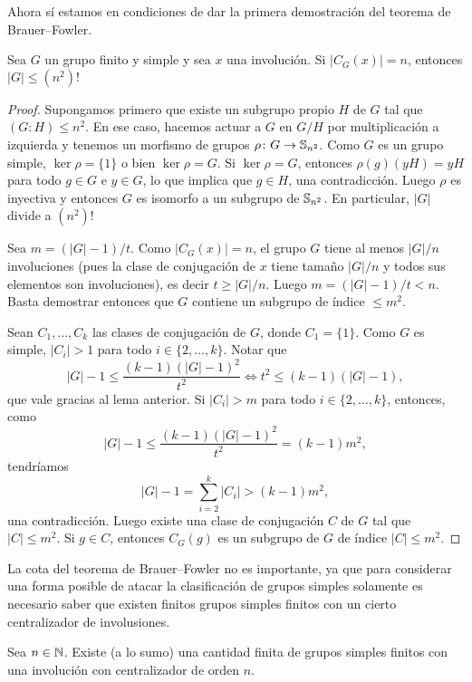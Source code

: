 Ahora sí estamos en condiciones de dar la primera demostración del teorema de
Brauer--Fowler. 

\begin{theorem}
Sea $G$ un grupo finito y simple y sea $x$ una involución. Si $|C_G(x)|=n$, entonces $|G|\leq (n^2)!$	
\end{theorem}

\begin{proof}
Supongamos primero que existe un subgrupo propio $H$ de $G$ tal que
$(G:H)\leq n^2$. En ese caso, hacemos actuar a $G$ en $G/H$ por multiplicación a izquierda 
y tenemos un morfismo de grupos $\rho\colon G\to\mathbb{S}_{n^2}$. Como $G$ es un grupo simple, 
$\ker\rho=\{1\}$ o bien $\ker\rho=G$. Si $\ker\rho=G$, entonces $\rho(g)(yH)=yH$ para todo
$g\in G$ e $y\in G$, lo que implica que $g\in H$, una contradicción. Luego $\rho$ es inyectiva
y entonces $G$ es isomorfo a un subgrupo de $\mathbb{S}_{n^2}$. En particular, $|G|$ divide a $(n^2)!$

Sea $m=(|G|-1)/t$. 
Como $|C_G(x)|=n$, el grupo $G$ tiene al menos $|G|/n$ involuciones (pues la clase de conjugación
de $x$ tiene tamaño $|G|/n$ y todos sus elementos son involuciones), es decir $t\geq |G|/n$. Luego
$m=(|G|-1)/t<n$. Basta demostrar entonces que $G$ contiene un subgrupo de índice $\leq m^2$. 

Sean $C_1,\dots,C_k$ las clases de conjugación de $G$, donde $C_1=\{1\}$. 
Como $G$ es simple, $|C_i|>1$ 
para todo $i\in\{2,\dots,k\}$. Notar que 
\[
|G|-1\leq\frac{(k-1)(|G|-1)^2}{t^2}\Longleftrightarrow t^2\leq(k-1)(|G|-1),
\]
que vale gracias al lema anterior. 
Si $|C_i|>m$ para todo $i\in\{2,\dots,k\}$, entonces, como
\[
|G|-1\leq\frac{(k-1)(|G|-1)^2}{t^2}=(k-1)m^2,
\]
tendríamos 
\[
|G|-1=\sum_{i=2}^k|C_i|>(k-1)m^2,
\]
una contradicción. Luego existe una clase de conjugación $C$ de $G$ tal que $|C|\leq m^2$. Si $g\in C$, entonces
$C_G(g)$ es un subgrupo de $G$ de índice $|C|\leq m^2$.
\end{proof}

La cota del teorema de Brauer--Fowler no es importante, ya que
para considerar una forma posible de atacar la clasificación de grupos simples 
solamente es necesario saber que existen  
finitos grupos simples finitos con un cierto centralizador de involusiones.

\begin{corollary}
Sea $n\in\mathbb{N}$. Existe (a lo sumo) una cantidad finita de grupos simples 
finitos con una involución con centralizador de orden $n$. 
\end{corollary}

